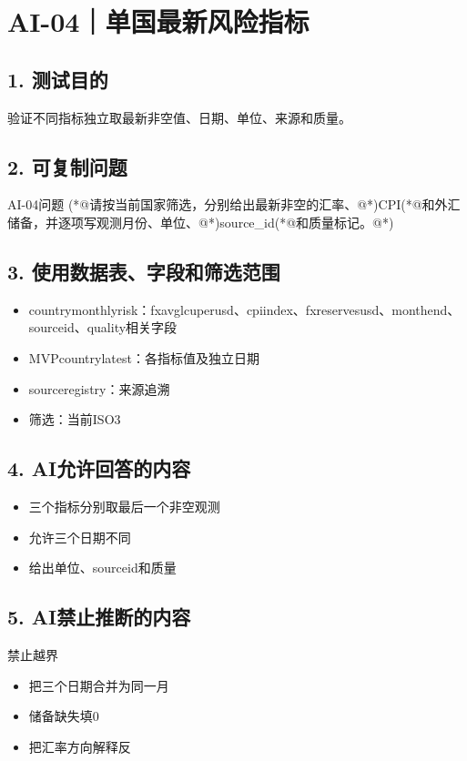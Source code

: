 \documentclass[UTF8,openany,zihao=-4]{ctexbook}
\renewcommand{\_}{\textunderscore\allowbreak}
\begin{document}
\clearpage
\section{AI-04｜单国最新风险指标}
\subsection*{1. 测试目的}
验证不同指标独立取最新非空值、日期、单位、来源和质量。


\subsection*{2. 可复制问题}
\begin{PromptBox}{AI-04问题}
(*@{\promptcjk 请按当前国家筛选，分别给出最新非空的汇率、}@*)CPI(*@{\promptcjk 和外汇储备，并逐项写观测月份、单位、}@*)source_id(*@{\promptcjk 和质量标记。}@*)
\end{PromptBox}

\subsection*{3. 使用数据表、字段和筛选范围}
\begin{itemize}
\item country\_monthly\_risk：fx\_avg\_lcu\_per\_usd、cpi\_index、fx\_reserves\_usd、month\_end、source\_id、quality相关字段
\item MVP\_country\_latest：各指标值及独立日期
\item source\_registry：来源追溯
\item 筛选：当前ISO3
\end{itemize}

\subsection*{4. AI允许回答的内容}
\begin{itemize}
\item 三个指标分别取最后一个非空观测
\item 允许三个日期不同
\item 给出单位、source\_id和质量
\end{itemize}

\subsection*{5. AI禁止推断的内容}
\begin{dangerbox}{禁止越界}
\begin{itemize}
\item 把三个日期合并为同一月
\item 储备缺失填0
\item 把汇率方向解释反
\end{itemize}
\end{dangerbox}
\end{document}
